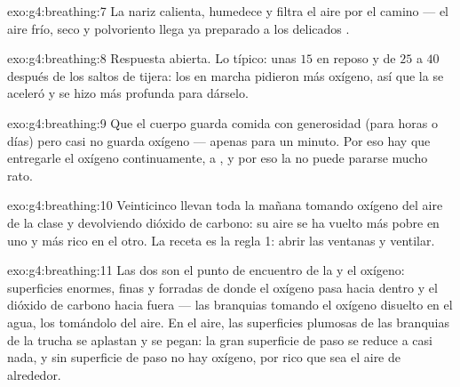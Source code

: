 \begin{solution}{exo:g4:breathing:7}
La nariz calienta, humedece y filtra el aire por el camino --- el aire
frío, seco y polvoriento llega ya preparado a los delicados .
\end{solution}

\begin{solution}{exo:g4:breathing:8}
Respuesta abierta. Lo típico: unas $15$ en reposo y de $25$ a $40$
después de los saltos de tijera: los  en marcha pidieron más
oxígeno, así que la  se aceleró y se hizo más profunda para
dárselo.
\end{solution}

\begin{solution}{exo:g4:breathing:9}
Que el cuerpo guarda comida con generosidad (para horas o días) pero
casi no guarda oxígeno --- apenas para un minuto. Por eso hay que
entregarle el oxígeno continuamente,  a , y por
eso la  no puede pararse mucho rato.
\end{solution}

\begin{solution}{exo:g4:breathing:10}
Veinticinco  llevan toda la mañana tomando oxígeno del aire de
la clase y devolviendo dióxido de carbono: su aire se ha vuelto más
pobre en uno y más rico en el otro. La receta es la regla 1: abrir las
ventanas y ventilar.
\end{solution}

\begin{solution}{exo:g4:breathing:11}
Las dos son el punto de encuentro de la  y el oxígeno:
superficies enormes, finas y forradas de  donde el oxígeno pasa
hacia dentro y el dióxido de carbono hacia fuera --- las branquias
tomando el oxígeno disuelto en el agua, los  tomándolo del
aire. En el aire, las superficies plumosas de las branquias de la
trucha se aplastan y se pegan: la gran superficie de paso se reduce a
casi nada, y sin superficie de paso no hay oxígeno, por rico que sea
el aire de alrededor.
\end{solution}
